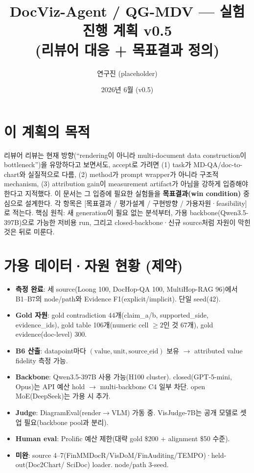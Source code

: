 \documentclass[11pt]{article}
\title{DocViz-Agent / QG-MDV — 실험 진행 계획 v0.5 \\
       (리뷰어 대응 + 목표결과 정의)}
\author{연구진 (placeholder)}
\date{2026년 6월 (v0.5)}
\begin{document}
\maketitle

\section{이 계획의 목적}

리뷰어 리뷰는 현재 방향(``rendering이 아니라 multi-document data construction이 bottleneck'')을
유망하다고 보면서도, accept로 가려면 (1) task가 MD-QA/doc-to-chart와 실질적으로 다름, (2) method가
prompt wrapper가 아니라 구조적 mechanism, (3) attribution gain이 measurement artifact가 아님을
강하게 입증해야 한다고 지적했다. 이 문서는 그 입증에 필요한 실험들을 \textbf{목표결과(win
condition)} 중심으로 설계한다. 각 항목은 [목표결과 / 평가설계 / 구현방향 / 가용자원·feasibility]
로 적는다. 핵심 원칙: 새 generation이 필요 없는 분석부터, 가용 backbone(Qwen3.5-397B)으로 가능한
저비용 run, 그리고 closed-backbone·신규 source처럼 자원이 막힌 것은 뒤로 미룬다.

\section{가용 데이터·자원 현황 (제약)}

\begin{itemize}[leftmargin=*]
    \item \textbf{측정 완료}: 세 source(Loong 100, DocHop-QA 100, MultiHop-RAG 96)에서 B1--B7의
    node/path와 Evidence F1(explicit/implicit). 단일 seed(42).
    \item \textbf{Gold 자원}: gold contradiction 44개(claim\_a/b, supported\_side, evidence\_ids),
    gold table 106개(numeric cell $\geq 2$인 것 67개), gold evidence(doc-level) 300.
    \item \textbf{B6 산출}: datapoint마다 $(\text{value}, \text{unit}, \text{source\_eid})$ 보유
    $\rightarrow$ attributed value fidelity 측정 가능.
    \item \textbf{Backbone}: Qwen3.5-397B 사용 가능(H100 cluster). closed(GPT-5-mini, Opus)는
    API 예산 hold $\rightarrow$ multi-backbone C4 일부 차단. open MoE(DeepSeek)는 가용 시 추가.
    \item \textbf{Judge}: DiagramEval(render$\rightarrow$VLM) 가동 중. VisJudge-7B는 공개 모델로
    셋업 필요(backbone pool과 분리).
    \item \textbf{Human eval}: Prolific 예산 제한(대략 gold \$200 + alignment \$50 수준).
    \item \textbf{미완}: source 4--7(FinMMDocR/VisDoM/FinAuditing/TEMPO)·held-out(Doc2Chart/
    SciDoc) loader. node/path 3-seed.
\end{itemize}
\end{document}
